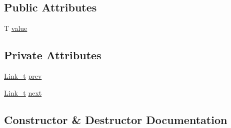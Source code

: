 \subsection*{Public Attributes}
\begin{DoxyCompactItemize}
\item 
T \mbox{\hyperlink{class_n_u_c_a_r_lock_free_d_s_1_1_lock_free_doubly_linked_list_1_1_linked_list_node_ae9136b50ed0477d43e6b6707b90c14c1}{value}}
\end{DoxyCompactItemize}
\subsection*{Private Attributes}
\begin{DoxyCompactItemize}
\item 
\mbox{\hyperlink{class_n_u_c_a_r_lock_free_d_s_1_1_lock_free_doubly_linked_list_a08f21d5e04bc2a02d6c1d8861a6ba0de}{Link\+\_\+t}} \mbox{\hyperlink{class_n_u_c_a_r_lock_free_d_s_1_1_lock_free_doubly_linked_list_1_1_linked_list_node_ae9d1647c3b7780a17ba51454410263d4}{prev}}
\item 
\mbox{\hyperlink{class_n_u_c_a_r_lock_free_d_s_1_1_lock_free_doubly_linked_list_a08f21d5e04bc2a02d6c1d8861a6ba0de}{Link\+\_\+t}} \mbox{\hyperlink{class_n_u_c_a_r_lock_free_d_s_1_1_lock_free_doubly_linked_list_1_1_linked_list_node_a332a3dae6b1138e2283734792c85a97c}{next}}
\end{DoxyCompactItemize}


\subsection{Constructor \& Destructor Documentation}
\mbox{\label{class_n_u_c_a_r_lock_free_d_s_1_1_lock_free_doubly_linked_list_1_1_linked_list_node_a47208e6922870bba81cbd7c59265b4b4}} 
